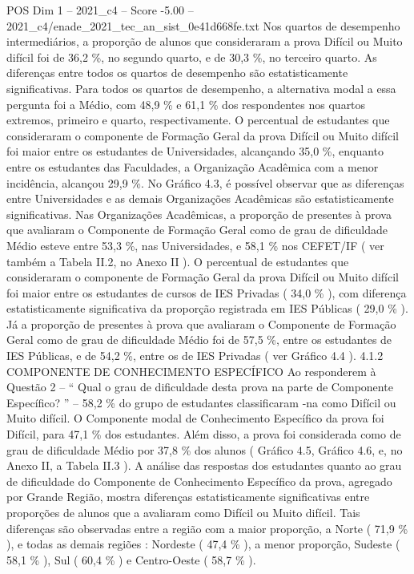 \begin{textsample}{POS Dim 1 – 2021\_c4 – Score -5.00 – 2021\_c4/enade\_2021\_tec\_an\_sist\_0e41d668fe.txt}
Nos quartos de desempenho intermediários, a proporção de alunos que consideraram a prova Difícil ou Muito difícil foi de 36,2 \%, no segundo quarto, e de 30,3 \%, no terceiro quarto.
As diferenças entre todos os quartos de desempenho são estatisticamente significativas.
Para todos os quartos de desempenho, a alternativa modal a essa pergunta foi a Médio, com 48,9 \% e 61,1 \% dos respondentes nos quartos extremos, primeiro e quarto, respectivamente.
O percentual de estudantes que consideraram o componente de Formação Geral da prova Difícil ou Muito difícil foi maior entre os estudantes de Universidades, alcançando 35,0 \%, enquanto entre os estudantes das Faculdades, a Organização Acadêmica com a menor incidência, alcançou 29,9 \%.
No Gráfico 4.3, é possível observar que as diferenças entre Universidades e as demais Organizações Acadêmicas são estatisticamente significativas.
Nas Organizações Acadêmicas, a proporção de presentes à prova que avaliaram o Componente de Formação Geral como de grau de dificuldade Médio esteve entre 53,3 \%, nas Universidades, e 58,1 \% nos CEFET/IF ( ver também a Tabela II.2, no Anexo II ).
O percentual de estudantes que consideraram o componente de Formação Geral da prova Difícil ou Muito difícil foi maior entre os estudantes de cursos de IES Privadas ( 34,0 \% ), com diferença estatisticamente significativa da proporção registrada em IES Públicas ( 29,0 \% ).
Já a proporção de presentes à prova que avaliaram o Componente de Formação Geral como de grau de dificuldade Médio foi de 57,5 \%, entre os estudantes de IES Públicas, e de 54,2 \%, entre os de IES Privadas ( ver Gráfico 4.4 ). 4.1.2 COMPONENTE DE CONHECIMENTO ESPECÍFICO Ao responderem à Questão 2 – “ Qual o grau de dificuldade desta prova na parte de Componente Específico? ” – 58,2 \% do grupo de estudantes classificaram -na como Difícil ou Muito difícil.
O Componente modal de Conhecimento Específico da prova foi Difícil, para 47,1 \% dos estudantes.
Além disso, a prova foi considerada como de grau de dificuldade Médio por 37,8 \% dos alunos ( Gráfico 4.5, Gráfico 4.6, e, no Anexo II, a Tabela II.3 ).
A análise das respostas dos estudantes quanto ao grau de dificuldade do Componente de Conhecimento Específico da prova, agregado por Grande Região, mostra diferenças estatisticamente significativas entre proporções de alunos que a avaliaram como Difícil ou Muito difícil.
Tais diferenças são observadas entre a região com a maior proporção, a Norte ( 71,9 \% ), e todas as demais regiões : Nordeste ( 47,4 \% ), a menor proporção, Sudeste ( 58,1 \% ), Sul ( 60,4 \% ) e Centro-Oeste ( 58,7 \% ).

\end{textsample}

